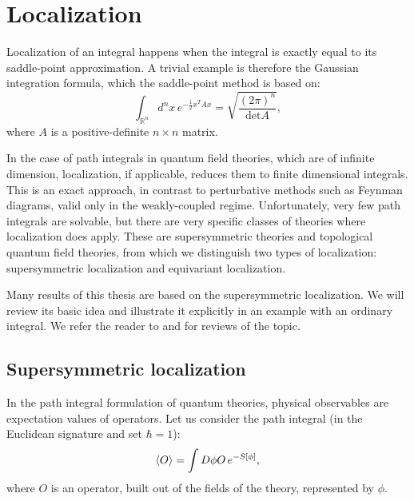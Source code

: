 \chapter{Localization}
Localization of an integral happens when the integral is exactly equal to its saddle-point approximation.
A trivial example is therefore the Gaussian integration formula, which the saddle-point method is based on:
\begin{equation}\label{GaussianIntegral}
 \int_{\mathbb{R}^n} d^n x \, e^{-\frac{1}{2} x^T A x} = \sqrt{\dfrac{(2\pi)^n}{\text{det}A}},
\end{equation}
where $A$ is a positive-definite $n\times n$ matrix.


In the case of path integrals in quantum field theories, which are of infinite dimension,
localization, if applicable, reduces them to finite dimensional integrals.
This is an exact approach, in contrast to perturbative methods such as Feynman diagrams,
valid only in the weakly-coupled regime.
Unfortunately, very few path integrals are solvable, 
but there are very specific classes of theories where localization does apply.
These are supersymmetric theories and topological quantum field theories,
from which we distinguish two types of localization:
supersymmetric localization and equivariant localization.

Many results of this thesis are based on the supersymmetric localization.
We will review its basic idea and illustrate it explicitly in an example with an ordinary integral. 
We refer the reader to \cite{Szabo:1996md} and \cite{Pestun:2016zxk} for reviews of the topic.


\section{Supersymmetric localization}

In the path integral formulation of quantum theories, 
physical observables are expectation values of operators.
Let us consider the path integral (in the Euclidean signature and set $\hbar = 1$):
\begin{equation}
 \braket{O} = \int D\phi O \, e^{-S[\phi]},
\end{equation}
where $O$ is an operator, built out of the fields of the theory, represented by $\phi$.

